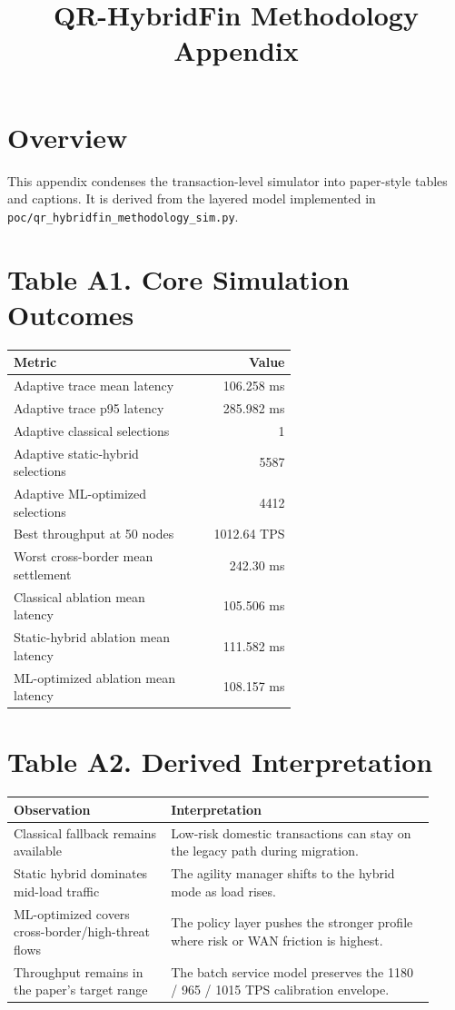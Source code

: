 \documentclass[11pt]{article}
\title{QR-HybridFin Methodology Appendix}
\author{}
\date{}
\begin{document}
\maketitle
\section*{Overview}
This appendix condenses the transaction-level simulator into paper-style tables and captions.
It is derived from the layered model implemented in \texttt{poc/qr\_hybridfin\_methodology\_sim.py}.
\section*{Table A1. Core Simulation Outcomes}
\begin{table}[h]
\centering
\begin{tabular}{@{}p{0.62\linewidth}r@{}}
\toprule
Metric & Value \\
\midrule
Adaptive trace mean latency & 106.258 ms \\
Adaptive trace p95 latency & 285.982 ms \\
Adaptive classical selections & 1 \\
Adaptive static-hybrid selections & 5587 \\
Adaptive ML-optimized selections & 4412 \\
Best throughput at 50 nodes & 1012.64 TPS \\
Worst cross-border mean settlement & 242.30 ms \\
Classical ablation mean latency & 105.506 ms \\
Static-hybrid ablation mean latency & 111.582 ms \\
ML-optimized ablation mean latency & 108.157 ms \\
\bottomrule
\end{tabular}
\end{table}
\section*{Table A2. Derived Interpretation}
\begin{table}[h]
\centering
\begin{tabular}{@{}p{0.34\linewidth}p{0.58\linewidth}@{}}
\toprule
Observation & Interpretation \\
\midrule
Classical fallback remains available & Low-risk domestic transactions can stay on the legacy path during migration. \\
Static hybrid dominates mid-load traffic & The agility manager shifts to the hybrid mode as load rises. \\
ML-optimized covers cross-border/high-threat flows & The policy layer pushes the stronger profile where risk or WAN friction is highest. \\
Throughput remains in the paper's target range & The batch service model preserves the 1180 / 965 / 1015 TPS calibration envelope. \\
\bottomrule
\end{tabular}
\end{table}
\end{document}
